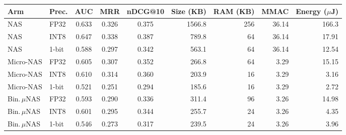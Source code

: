 \begin{tabular}{llcccrrrr}
\toprule
Arm & Prec. & AUC & MRR & nDCG@10 & Size (KB) & RAM (KB) & MMAC & Energy ($\mu$J)\\
\midrule
NAS & FP32 & 0.633 & 0.326 & 0.375 & 1566.8 & 256 & 36.14 & 166.3\\
NAS & INT8 & 0.647 & 0.338 & 0.387 & 789.8 & 64 & 36.14 & 17.91\\
NAS & 1-bit & 0.588 & 0.297 & 0.342 & 563.1 & 64 & 36.14 & 12.54\\
\midrule
Micro-NAS & FP32 & 0.605 & 0.307 & 0.352 & 266.8 & 64 & 3.29 & 15.15\\
Micro-NAS & INT8 & 0.610 & 0.314 & 0.360 & 203.9 & 16 & 3.29 & 3.16\\
Micro-NAS & 1-bit & 0.521 & 0.251 & 0.294 & 185.6 & 16 & 3.29 & 2.72\\
\midrule
Bin.\,$\mu$NAS & FP32 & 0.593 & 0.290 & 0.336 & 311.4 & 96 & 3.26 & 14.98\\
Bin.\,$\mu$NAS & INT8 & 0.601 & 0.295 & 0.344 & 255.7 & 24 & 3.26 & 4.35\\
Bin.\,$\mu$NAS & 1-bit & 0.546 & 0.273 & 0.317 & 239.5 & 24 & 3.26 & 3.96\\
\bottomrule
\end{tabular}
